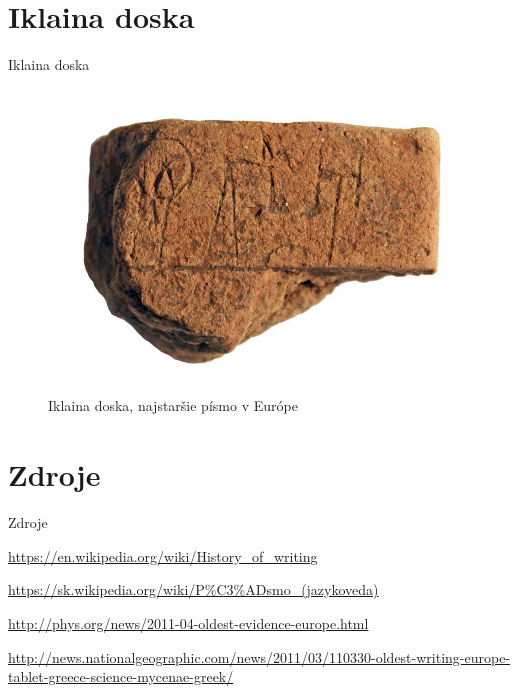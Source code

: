 \documentclass{beamer}
\begin{document}
	\section{Iklaina doska}
	
	\begin{frame}{Iklaina doska}
		\transwipe
		\begin{figure}[H]
			\centering
			\includegraphics[scale=0.3]{tabletin}	
			\caption{Iklaina doska, najstaršie písmo v Európe}
			\label{picKlin}
		\end{figure}
	\end{frame}
		


	\section{Zdroje}
	\transwipe
	\begin{frame}{Zdroje}
		\transwipe
		\begin{itemize}
			\scriptsize{
				\item \url{https://en.wikipedia.org/wiki/History_of_writing}
				\item \url{https://sk.wikipedia.org/wiki/P\%C3\%ADsmo_(jazykoveda)}
				\item \url{http://phys.org/news/2011-04-oldest-evidence-europe.html}
				\item \url{http://news.nationalgeographic.com/news/2011/03/110330-oldest-writing-europe-tablet-greece-science-mycenae-greek/}
			}
		\end{itemize}
	\end{frame}
\end{document}
